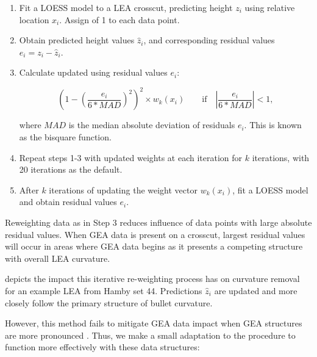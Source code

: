 \documentclass[12pt]{article}
\begin{document}
\begin{enumerate}

\item Fit a LOESS model to a LEA crosscut, predicting height $z_i$ using relative location $x_i$. Assign  of 1 to each data point.  
\item Obtain predicted height values $\widehat{z}_i$, and corresponding residual values $e_i = z_i - \widehat{z}_i$. 
\item Calculate updated  using residual values $e_i$: 

$$\left(1 - \left(\frac{e_i}{6*MAD}\right)^2\right)^2 \times w_k(x_i) \quad \quad \mbox{if}\quad \left|\frac{e_i}{6*MAD} \right| < 1,$$

where $MAD$ is the median absolute deviation of residuals $e_i$. This is known as the bisquare function.  
\item Repeat steps 1-3 with updated weights at each iteration for $k$ iterations, with 20 iterations as the default.  
\item After $k$ iterations of updating the weight vector $w_k(x_i)$, fit a LOESS model and obtain residual values $e_i$.  

\end{enumerate}

Reweighting data as in Step 3 reduces influence of data points with
large absolute residual values. When GEA data is present on a crosscut,
largest residual values will occur in areas where GEA data begins as it
presents a competing structure with overall LEA curvature.

 depicts the impact this iterative
re-weighting process has on curvature removal for an example LEA from
Hamby set 44. Predictions \(\widehat{z}_i\) are updated and more closely
follow the primary structure of bullet curvature.

However, this method fails to mitigate GEA data impact when GEA
structures are more pronounced
. Thus, we make a small
adaptation to the procedure to function more effectively with these data
structures:
\end{document}
